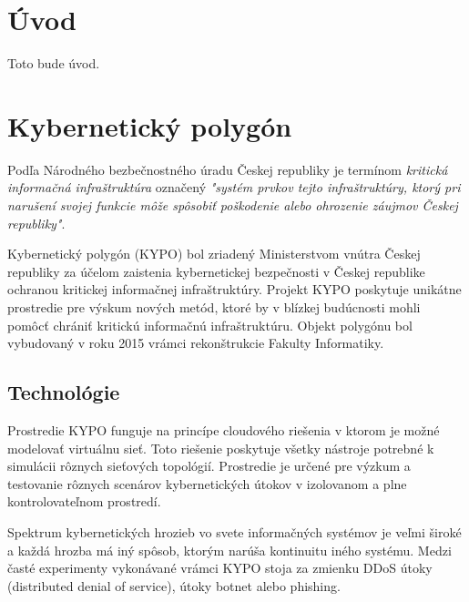 \documentclass[
  digital, %
  twoside, %
  notable,   %
  nolof,   %
  nolot,   %
]{fithesis3}
\begin{document}
\chapter*{Úvod}
Toto bude úvod.

\chapter{Kybernetický polygón}
Podľa Národného bezbečnostného úradu Českej republiky je termínom \textit{kritická informačná infraštruktúra} označený \textit{"systém prvkov tejto infraštruktúry, ktorý pri narušení svojej funkcie môže spôsobiť poškodenie alebo ohrozenie záujmov Českej republiky"}\cite{nbu2012}.

Kybernetický polygón (KYPO) bol zriadený Ministerstvom vnútra Českej republiky za účelom zaistenia kybernetickej bezpečnosti v Českej republike ochranou kritickej informačnej infraštruktúry. Projekt KYPO poskytuje unikátne prostredie pre výskum nových metód, ktoré by v blízkej budúcnosti mohli pomôcť chrániť kritickú informačnú infraštruktúru\cite{dankovvcikova2015konfigurace}. Objekt polygónu bol vybudovaný v roku 2015 vrámci rekonštrukcie Fakulty Informatiky.

\section{Technológie}
Prostredie KYPO funguje na princípe cloudového riešenia v ktorom je možné modelovať virtuálnu sieť\cite{eichler2014analytical}. Toto riešenie poskytuje všetky nástroje potrebné k simulácii rôznych sieťových topológií. Prostredie je určené pre výzkum a testovanie rôznych scenárov kybernetických útokov v izolovanom a plne kontrolovateľnom prostredí\cite{vceleda2015kypo}.

Spektrum kybernetických hrozieb vo svete informačných systémov je veľmi široké a každá hrozba má iný spôsob, ktorým narúša kontinuitu iného systému. Medzi časté experimenty vykonávané vrámci KYPO stoja za zmienku DDoS útoky (distributed denial of service), útoky botnet alebo phishing\cite{vcegan2014navrh, celeda2013projekt}.
\end{document}
